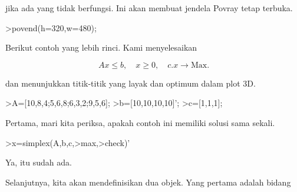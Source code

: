 \documentclass{article}
\begin{document}
\begin{eulernotebook}
\begin{eulercomment}
jika ada yang tidak berfungsi. Ini akan membuat jendela Povray tetap
terbuka.
\end{eulercomment}
\begin{eulerprompt}
>povend(h=320,w=480);
\end{eulerprompt}
\begin{eulercomment}
Berikut contoh yang lebih rinci. Kami menyelesaikan

\end{eulercomment}
\begin{eulerformula}
\[
Ax \le b, \quad x \ge 0, \quad c.x \to \text{Max.}
\]
\end{eulerformula}
\begin{eulercomment}
dan menunjukkan titik-titik yang layak dan optimum dalam plot 3D.
\end{eulercomment}
\begin{eulerprompt}
>A=[10,8,4;5,6,8;6,3,2;9,5,6];
>b=[10,10,10,10]';
>c=[1,1,1];
\end{eulerprompt}
\begin{eulercomment}
Pertama, mari kita periksa, apakah contoh ini memiliki solusi sama
sekali.
\end{eulercomment}
\begin{eulerprompt}
>x=simplex(A,b,c,>max,>check)'
\end{eulerprompt}
\begin{euleroutput}
  [0,  1,  0.5]
\end{euleroutput}
\begin{eulercomment}
Ya, itu sudah ada.

Selanjutnya, kita akan mendefinisikan dua objek. Yang pertama adalah
bidang


\end{eulercomment}
\end{eulernotebook}
\end{document}
